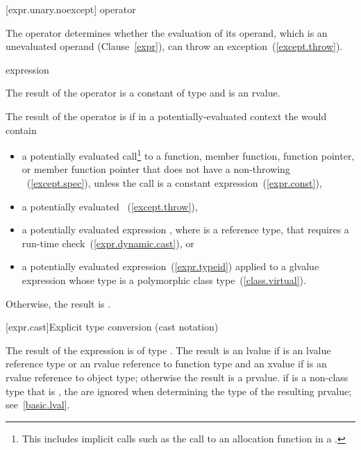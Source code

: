 [expr.unary.noexcept]{ operator}

\pnum
{}%
The  operator determines whether the evaluation of its operand,
which is an unevaluated operand (Clause~\ref{expr}), can throw an
exception~(\ref{except.throw}).

\begin{bnf}
\br
   \terminal{(} expression \terminal{)}
\end{bnf}

\pnum
The result of the  operator is a constant of type 
and is an rvalue.

\pnum
The result of the  operator is  if in a
potentially-evaluated context the  would contain

\begin{itemize}
\item a potentially evaluated call\footnote{This includes implicit calls such as
the call to an allocation function in a .}
to a function, member function, function pointer, or member function pointer
that does not have a non-throwing ~(\ref{except.spec}),
unless the call is a constant expression~(\ref{expr.const}),

\item a potentially evaluated ~(\ref{except.throw}),

\item a potentially evaluated  expression
, where  is a reference type,
that requires a run-time check~(\ref{expr.dynamic.cast}), or

\item a potentially evaluated  expression~(\ref{expr.typeid}) applied to
a glvalue expression whose type is a polymorphic class type~(\ref{class.virtual}).
\end{itemize}

Otherwise, the result is .%

[expr.cast]{Explicit type conversion (cast notation)}%

\pnum
The result of the expression   is
of type . The result is an lvalue if  is an lvalue
reference type or an rvalue reference to function type and an xvalue if 
is an rvalue reference to object type; otherwise the result is a prvalue.
\enternote 
if  is a non-class type that is , the
 are ignored when determining the type of the
resulting prvalue; see~\ref{basic.lval}.
\exitnote 

